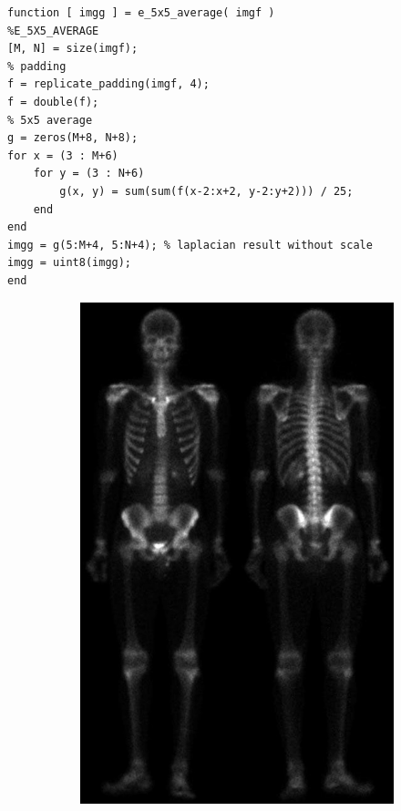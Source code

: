 \lstset{language=Matlab}
\begin{lstlisting}
function [ imgg ] = e_5x5_average( imgf )
%E_5X5_AVERAGE
[M, N] = size(imgf);
% padding
f = replicate_padding(imgf, 4);
f = double(f);
% 5x5 average
g = zeros(M+8, N+8);
for x = (3 : M+6)
    for y = (3 : N+6)
        g(x, y) = sum(sum(f(x-2:x+2, y-2:y+2))) / 25;
    end
end
imgg = g(5:M+4, 5:N+4); % laplacian result without scale
imgg = uint8(imgg);
end
\end{lstlisting}

\clearpage

\begin{figure}[h!]
	\centering
	\begin{subfigure}[b]{0.4\linewidth}
		\includegraphics[width=\linewidth]{myfigure/p2/2-a.png}

\end{subfigure}
\end{figure}
